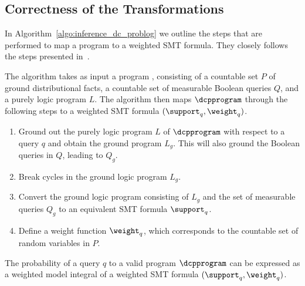 \subsection{Correctness of the Transformations}

In Algorithm~\ref{algo:inference_dc_problog} we outline the steps that are performed to map a \dcplpsty program to a weighted SMT formula. They closely follows the steps presented in~\citep[Section 5]{fierens2015inference}. 

\begin{mdframed}
	\begin{algo} \label{algo:inference_dc_problog}
		The algorithm takes as input a \dcplpsty program \dcpprogram, consisting of a countable set $P$ of ground distributional facts, a countable set of measurable Boolean queries $Q$, and a purely logic program $L$. The algorithm then maps $\dcpprogram$ through the following steps to a weighted SMT formula $(\support_q, \weight_q)$.
		\begin{enumerate}
			\item Ground out the purely logic program $L$ of $\dcpprogram$ with respect to a query $q$ and obtain the ground program $L_g$. This will also ground the Boolean queries in $Q$, leading to $Q_g$.
    		\item Break cycles in the ground logic program $L_g$.
			\item Convert the ground logic program consisting of $L_g$ and the set of measurable queries $Q_g$ to an equivalent SMT formula $\support_q$.
			\item Define a weight function $\weight_q$, which corresponds to the countable set of random variables in $P$.
		\end{enumerate}
	\end{algo}
\end{mdframed}


\begin{theorem}
The probability of a query $q$ to a valid \dcplpsty program $\dcpprogram$ can be expressed as a weighted model integral of a weighted SMT formula $(\support_q, \weight_q)$.
\end{theorem}




